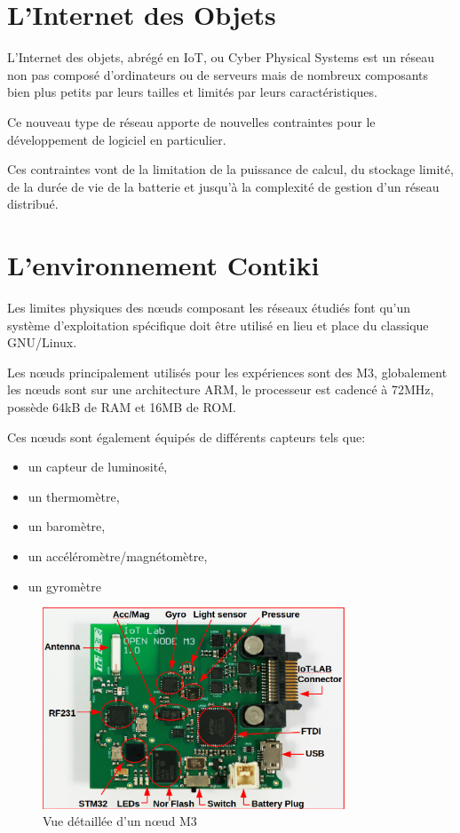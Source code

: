 \section{L'Internet des Objets}

L'Internet des objets, abrégé en IoT, ou Cyber Physical Systems est un réseau non pas composé d'ordinateurs ou de serveurs mais de nombreux composants bien plus petits par leurs tailles et limités par leurs caractéristiques.

Ce nouveau type de réseau apporte de nouvelles contraintes pour le développement de logiciel en particulier.

Ces contraintes vont de la limitation de la puissance de calcul, du stockage limité, de la durée de vie de la batterie et jusqu'à la complexité de gestion d'un réseau distribué.

\section{L'environnement Contiki}

Les limites physiques des nœuds composant les réseaux étudiés font qu'un système d'exploitation spécifique doit être utilisé en lieu et place du classique GNU/Linux.

Les nœuds principalement utilisés pour les expériences sont des M3, globalement les nœuds sont sur une architecture ARM, le processeur est cadencé à 72MHz, possède 64kB de RAM et 16MB de ROM.

Ces nœuds sont également équipés de différents capteurs tels que:
\begin{itemize}
\item un capteur de luminosité,
\item un thermomètre,
\item un baromètre,
\item un accéléromètre/magnétomètre,
\item un gyromètre
\end{itemize}

\begin{figure}[ht!]
\centering
\includegraphics[width=90mm]{images/m3opennode.png}
\caption{Vue détaillée d'un nœud M3}
\end{figure}

